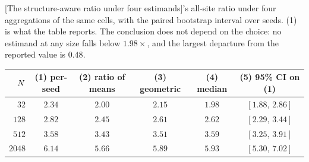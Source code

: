 
\begin{center}
\begin{minipage}{\linewidth}\small\centering
{}[The structure-aware ratio under four estimands]{\structuredtable{}'s all-site ratio under four
aggregations of the same cells, with the paired bootstrap interval over seeds.
(1) is what the table reports. The conclusion does not depend on the choice: no
estimand at any size falls below $1.98\times$, and the largest
departure from the reported value is $0.48$.}
\label{tab:aggregation-structured}
\begin{tabular}{rccccc}
\toprule
$N$ & (1) per-seed & (2) ratio of means & (3) geometric & (4) median & (5) 95\% CI on (1) \\
\midrule
$32$ & $2.34$ & $2.00$ & $2.15$ & $1.98$ & $[1.88,\, 2.86]$ \\
$128$ & $2.82$ & $2.45$ & $2.61$ & $2.62$ & $[2.29,\, 3.44]$ \\
$512$ & $3.58$ & $3.43$ & $3.51$ & $3.59$ & $[3.25,\, 3.91]$ \\
$2048$ & $6.14$ & $5.66$ & $5.89$ & $5.93$ & $[5.30,\, 7.02]$ \\
\bottomrule
\end{tabular}
\end{minipage}
\end{center}
